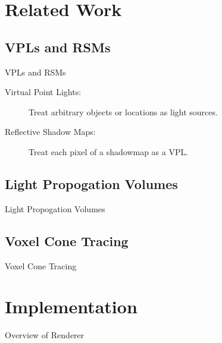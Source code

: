 \documentclass[10pt]{beamer}
\begin{document}

\section{Related Work}

\subsection{VPLs and RSMs}
\begin{frame}{VPLs and RSMs}
  \begin{description}
    \item[Virtual Point Lights:] Treat arbitrary objects or locations as light sources.
    \item[Reflective Shadow Maps:] Treat each pixel of a shadowmap as a VPL. %
  \end{description}
\end{frame}

\subsection{Light Propogation Volumes}
\begin{frame}{Light Propogation Volumes}
\end{frame}

\subsection{Voxel Cone Tracing}
\begin{frame}{Voxel Cone Tracing}
\end{frame}


\section{Implementation}

\begin{frame}{Overview of Renderer}
\end{frame}
\end{document}
